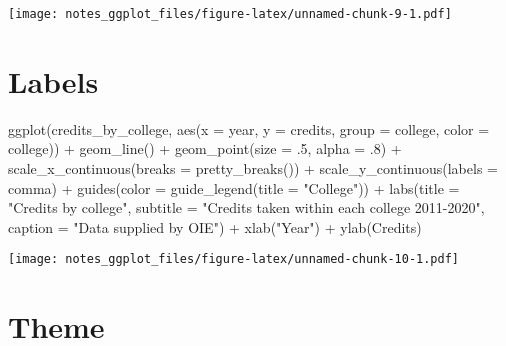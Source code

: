 \documentclass[
]{book}
\newenvironment{Shaded}{\begin{snugshade}}{\end{snugshade}}
\newcommand{\AttributeTok}[1]{\textcolor[rgb]{0.77,0.63,0.00}{#1}}
\newcommand{\DecValTok}[1]{\textcolor[rgb]{0.00,0.00,0.81}{#1}}
\newcommand{\FunctionTok}[1]{\textcolor[rgb]{0.00,0.00,0.00}{#1}}
\newcommand{\NormalTok}[1]{#1}
\newcommand{\SpecialCharTok}[1]{\textcolor[rgb]{0.00,0.00,0.00}{#1}}
\newcommand{\StringTok}[1]{\textcolor[rgb]{0.31,0.60,0.02}{#1}}
\begin{document}
\texttt{[image: notes\_ggplot\_files/figure-latex/unnamed-chunk-9-1.pdf]}

\hypertarget{labels}{%
\section{Labels}\label{labels}}

\begin{Shaded}
\begin{Highlighting}[]
\FunctionTok{ggplot}\NormalTok{(credits\_by\_college, }\FunctionTok{aes}\NormalTok{(}\AttributeTok{x =}\NormalTok{ year, }\AttributeTok{y =}\NormalTok{ credits, }\AttributeTok{group =}\NormalTok{ college, }\AttributeTok{color =}\NormalTok{ college)) }\SpecialCharTok{+} 
  \FunctionTok{geom\_line}\NormalTok{() }\SpecialCharTok{+} \FunctionTok{geom\_point}\NormalTok{(}\AttributeTok{size =}\NormalTok{ .}\DecValTok{5}\NormalTok{, }\AttributeTok{alpha =}\NormalTok{ .}\DecValTok{8}\NormalTok{) }\SpecialCharTok{+}
  \FunctionTok{scale\_x\_continuous}\NormalTok{(}\AttributeTok{breaks =} \FunctionTok{pretty\_breaks}\NormalTok{()) }\SpecialCharTok{+}
  \FunctionTok{scale\_y\_continuous}\NormalTok{(}\AttributeTok{labels =}\NormalTok{ comma) }\SpecialCharTok{+}
  \FunctionTok{guides}\NormalTok{(}\AttributeTok{color =} \FunctionTok{guide\_legend}\NormalTok{(}\AttributeTok{title =} \StringTok{"College"}\NormalTok{)) }\SpecialCharTok{+}
  \FunctionTok{labs}\NormalTok{(}\AttributeTok{title =} \StringTok{"Credits by college"}\NormalTok{,}
       \AttributeTok{subtitle =} \StringTok{"Credits taken within each college 2011{-}2020"}\NormalTok{,}
       \AttributeTok{caption =} \StringTok{"Data supplied by OIE"}\NormalTok{) }\SpecialCharTok{+}
  \FunctionTok{xlab}\NormalTok{(}\StringTok{"Year"}\NormalTok{) }\SpecialCharTok{+}
  \FunctionTok{ylab}\NormalTok{(}\StringTok{\textquotesingle{}Credits\textquotesingle{}}\NormalTok{)}
\end{Highlighting}
\end{Shaded}

\texttt{[image: notes\_ggplot\_files/figure-latex/unnamed-chunk-10-1.pdf]}

\hypertarget{theme}{%
\section{Theme}\label{theme}}
\end{document}
